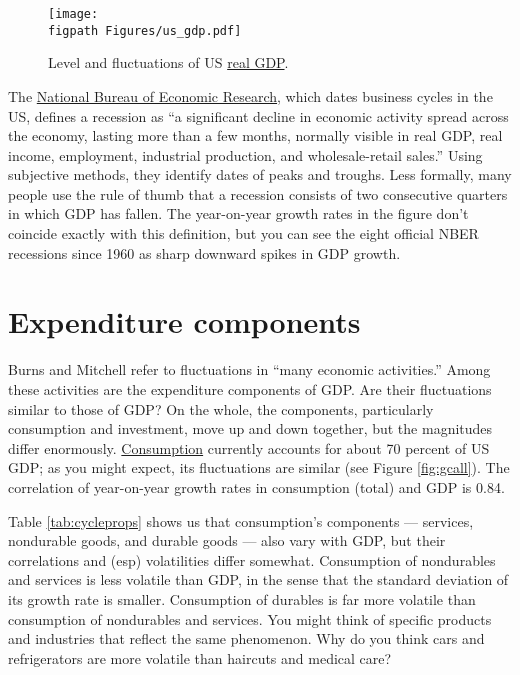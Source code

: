 \begin{figure}[ht]
 \caption{Level and fluctuations of US \href{http://research.stlouisfed.org/fred2/series/GDPC1?cid=106}{real GDP}.}
    \label{fig:yandgy}
    \centering
    \texttt{[image: \\figpath Figures/us\_gdp.pdf]}
\end{figure}

The \href{http://www.nber.org/cycles/main.html}{National Bureau of Economic Research},
which dates business cycles in the US,
defines a recession  as ``a significant decline
in economic activity spread across the economy,
lasting more than a few months, normally visible in real GDP,
real income, employment, industrial production,
and wholesale-retail sales.''
Using subjective methods, they identify dates of peaks and troughs.
Less formally, many people use the rule of thumb
that a recession consists of two consecutive quarters
in which GDP has fallen.
The year-on-year growth rates in the figure don't coincide exactly
with this definition, but you can see the eight official NBER
recessions since 1960 as sharp downward spikes in GDP growth.


\section{Expenditure components}

Burns and Mitchell refer to fluctuations in
``many economic activities.''
Among these activities are the expenditure
components of GDP.
Are their fluctuations similar to those of GDP?
On the whole, the components, particularly consumption and investment,
move up and down together, but the magnitudes differ enormously.
\href{http://research.stlouisfed.org/fred2/series/PCECC96?cid=110}{Consumption}
currently accounts for about 70 percent of US GDP;
as you might expect, its fluctuations are similar (see Figure \ref{fig:gcall}).
The correlation of year-on-year growth rates in consumption (total)
and GDP is 0.84.

Table \ref{tab:cycleprops} shows us that consumption's components ---
services, nondurable goods, and durable goods --- also vary with GDP,
but their correlations and (esp) volatilities differ somewhat.
Consumption of nondurables and services
is less volatile than GDP, in the sense that
the standard deviation of its growth rate is smaller.
Consumption of durables is far more
volatile %
than consumption of nondurables and services.
You might think of specific products and industries that reflect
the same phenomenon.
Why do you think cars and refrigerators
are more volatile than haircuts and medical care?

